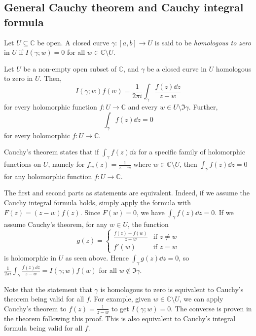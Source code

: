 \subsection{General Cauchy theorem and Cauchy integral formula}
\begin{definition}
	Let \( U \subseteq \mathbb C \) be open.
	A closed curve \( \gamma \colon [a,b] \to U \) is said to be \textit{homologous to zero} in \( U \) if \( I(\gamma; w) = 0 \) for all \( w \in \mathbb C \setminus U \).
\end{definition}
\begin{theorem}
	Let \( U \) be a non-empty open subset of \( \mathbb C \), and \( \gamma \) be a closed curve in \( U \) homologous to zero in \( U \).
	Then,
	\[ I(\gamma;w) f(w) = \frac{1}{2\pi i} \int_\gamma \frac{f(z) \dd{z}}{z-w} \]
	for every holomorphic function \( f \colon U \to \mathbb C \) and every \( w \in U \setminus \Im \gamma \).
	Further,
	\[ \int_\gamma f(z) \dd{z} = 0 \]
	for every holomorphic \( f \colon U \to \mathbb C \).
\end{theorem}
\begin{remark}
	Cauchy's theorem states that if \( \int_\gamma f(z) \dd{z} \) for a specific family of holomorphic functions on \( U \), namely for \( f_w(z) = \frac{1}{z-w} \) where \( w \in \mathbb C \setminus U \), then \( \int_\gamma f(z) \dd{z} = 0 \) for any holomorphic function \( f \colon U \to \mathbb C \).

	The first and second parts as statements are equivalent.
	Indeed, if we assume the Cauchy integral formula holds, simply apply the formula with \( F(z) = (z-w)f(z) \).
	Since \( F(w) = 0 \), we have \( \int_\gamma f(z) \dd{z} = 0 \).
	If we assume Cauchy's theorem, for any \( w \in U \), the function
	\[ g(z) = \begin{cases}
		\frac{f(z) - f(w)}{z-w} & \text{if } z \neq w \\
		f'(w) & \text{if } z = w
	\end{cases} \]
	is holomorphic in \( U \) as seen above.
	Hence \( \int_\gamma g(z) \dd{z} = 0 \), so \( \frac{1}{2\pi i} \int_\gamma \frac{f(z) \dd{z}}{z-w} = I(\gamma;w) f(w) \) for all \( w \not\in \Im \gamma \).

	Note that the statement that \( \gamma \) is homologous to zero is equivalent to Cauchy's theorem being valid for all \( f \).
	For example, given \( w \in \mathbb C \setminus U \), we can apply Cauchy's theorem to \( f(z) = \frac{1}{z-w} \) to get \( I(\gamma;w) = 0 \).
	The converse is proven in the theorem following this proof.
	This is also equivalent to Cauchy's integral formula being valid for all \( f \).
\end{remark}
